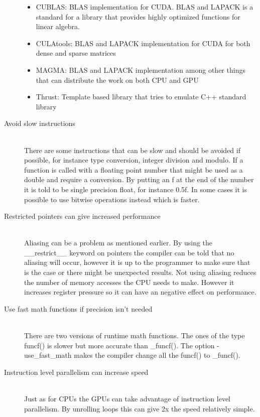 \documentclass[10pt,a4paper]{report}
\begin{document}
\begin{description}
  \begin{itemize}
    \item CUBLAS: BLAS implementation for CUDA. BLAS and LAPACK is a standard for a library that provides highly optimized functions for linear algebra.\cite{cublas}
    \item CULAtools: BLAS and LAPACK implementation for CUDA for both dense and sparse matrices\cite{culatools}
    \item MAGMA: BLAS and LAPACK implementation among other things that can distribute the work on both CPU and GPU\cite{magma_2010}
    \item Thrust: Template based library that tries to emulate C++ standard library\cite{thrust_gpu}
  \end{itemize}
  \item[Avoid slow instructions] \hfill \\
  There are some instructions that can be slow and should be avoided if possible, for instance type conversion, integer division and modulo. If a function is called with a floating point number that might be used as a double and require a conversion. By putting an f at the end of the number it is told to be single precision float, for instance 0.5f. In some cases it is possible to use bitwise operations instead which is faster.\cite{cuda, cuda_best_practice}
  \item[Restricted pointers can give increased performance] \hfill \\
  Aliasing can be a problem as mentioned earlier. By using the \_\_restrict\_\_ keyword on pointers the compiler can be told that no aliasing will occur, however it is up to the programmer to make sure that is the case or there might be unexpected results. Not using aliasing reduces the number of memory accesses the CPU needs to make. However it increases register pressure so it can have an negative effect on performance.\cite{cuda}
  \item[Use fast math functions if precision isn't needed] \hfill \\
  There are two versions of runtime math functions. The ones of the type funcf() is slower but more accurate than \_funcf(). The option -use\_fast\_math makes the compiler change all the funcf() to \_funcf().\cite{cuda_best_practice}
  \item[Instruction level parallelism can increase speed]\hfill \\
  Just as for CPUs the GPUs can take advantage of instruction level parallelism. By unrolling loops this can give 2x the speed relatively simple.\cite{volkov2011unrolling}
\end{description}
\end{document}
